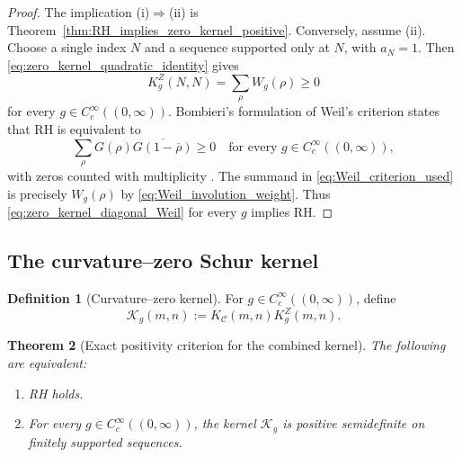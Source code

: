 \documentclass[11pt]{amsart}
\numberwithin{equation}{section}
\theoremstyle{plain}
\newtheorem{theorem}{Theorem}[section]
\theoremstyle{definition}
\newtheorem{definition}[theorem]{Definition}
\theoremstyle{remark}
\begin{document}
\begin{proof}
The implication (i)\(\Rightarrow\)(ii) is
Theorem~\ref{thm:RH_implies_zero_kernel_positive}.  Conversely, assume (ii).
Choose a single index \(N\) and a sequence supported only at \(N\), with
\(a_N=1\).  Then \eqref{eq:zero_kernel_quadratic_identity} gives
\begin{equation}
K_g^Z(N,N)=\sum_\rho W_g(\rho)\ge0
\label{eq:zero_kernel_diagonal_Weil}
\end{equation}
for every \(g\in C_c^\infty((0,\infty))\).  Bombieri's formulation of Weil's
criterion states that RH is equivalent to
\begin{equation}
\sum_\rho G(\rho)\overline{G(1-\overline\rho)}\ge0
\quad\text{for every }g\in C_c^\infty((0,\infty)),
\label{eq:Weil_criterion_used}
\end{equation}
with zeros counted with multiplicity
\cite{Weil1952,Bombieri2000}.  The summand in
\eqref{eq:Weil_criterion_used} is precisely \(W_g(\rho)\) by
\eqref{eq:Weil_involution_weight}.  Thus
\eqref{eq:zero_kernel_diagonal_Weil} for every \(g\) implies RH.
\end{proof}

\subsection{The curvature--zero Schur kernel}
\label{subsec:curvature_zero_schur}

\begin{definition}[Curvature--zero kernel]
\label{def:curvature_zero_kernel}
For \(g\in C_c^\infty((0,\infty))\), define
\begin{equation}
\mathscr K_g(m,n)
:=K_{\mathcal C}(m,n)K_g^Z(m,n).
\label{eq:curvature_zero_kernel}
\end{equation}
\end{definition}

\begin{theorem}[Exact positivity criterion for the combined kernel]
\label{thm:combined_kernel_RH_equivalence}
The following are equivalent:
\begin{enumerate}[label=(\roman*)]
\item RH holds.
\item For every \(g\in C_c^\infty((0,\infty))\), the kernel
\(\mathscr K_g\) is positive semidefinite on finitely supported sequences.
\end{enumerate}
\end{theorem}
\end{document}
